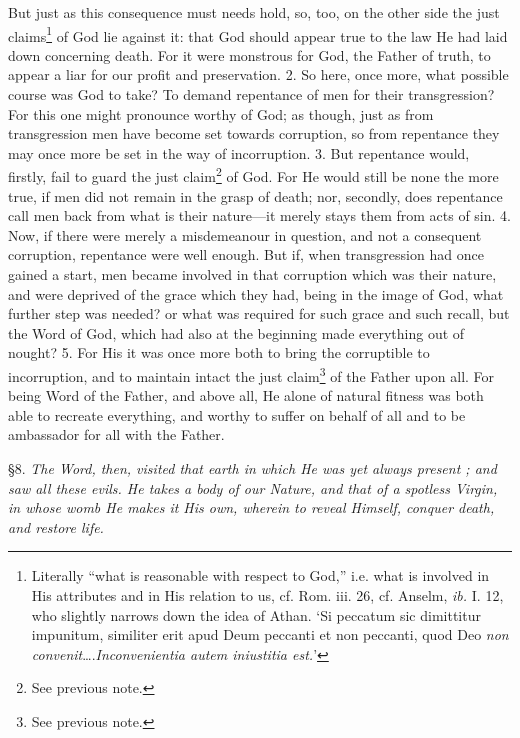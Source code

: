 But just as this consequence must needs hold, so, too, on the other side the just claims\footnote{Literally “what is reasonable with respect to God,” i.e. what is involved in His attributes and in His relation to us, cf. Rom. iii. 26, cf. Anselm, \emph{ib.} I. 12, who slightly narrows down the idea of Athan. ‘Si peccatum sic dimittitur impunitum, similiter erit apud Deum peccanti et non peccanti, quod Deo \emph{non convenit}….\emph{Inconvenientia autem iniustitia est.}’} of God lie against it: that God should appear true to the law He had laid down concerning death. For it were monstrous for God, the Father of truth, to appear a liar for our profit and preservation. 2. So here, once more, what possible course was God to take? To demand repentance of men for their transgression? For this one might pronounce worthy of God; as though, just as from transgression men have become set towards corruption, so from repentance they may once more be set in the way of incorruption. 3. But repentance would, firstly, fail to guard the just claim\footnote{See previous note.} of God. For He would still be none the more true, if men did not remain in the grasp of death; nor, secondly, does repentance call men back from what is their nature—it merely stays them from acts of sin. 4. Now, if there were merely a misdemeanour in question, and not a consequent corruption, repentance were well enough. But if, when transgression had once gained a start, men became involved in that corruption which was their nature, and were deprived of the grace which they had, being in the image of God, what further step was needed? or what was required for such grace and such recall, but the Word of God, which had also at the beginning made everything out of nought? 5. For His it was once more both to bring the corruptible to incorruption, and to maintain intact the just claim\footnote{See previous note.} of the Father upon all. For being Word of the Father, and above all, He alone of natural fitness was both able to recreate everything, and worthy to suffer on behalf of all and to be ambassador for all with the Father.


§8. \emph{The Word, then, visited that earth in which He was yet always present ; and saw all these evils. He takes a body of our Nature, and that of a spotless Virgin, in whose womb He makes it His own, wherein to reveal Himself, conquer death, and restore life.}

